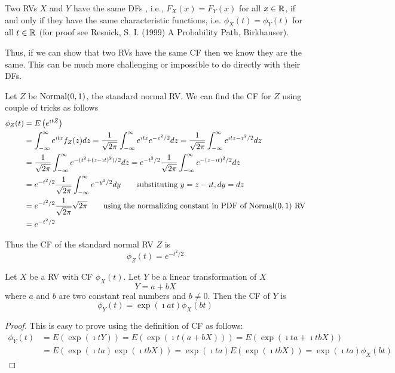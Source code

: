 Two RVs $X$ and $Y$ have the same DFs , i.e., $F_X(x) = F_Y(x)$ for all $x \in \mathbb{R}$, if and only if they have the same characteristic functions, i.e. $\phi_X(t) = \phi_Y(t)$ for all $t \in \mathbb{R}$ (for proof see Resnick, S. I. (1999) A Probability Path, Birkhauser). 

Thus, if we can show that two RVs have the same CF then we know they are the same.  This can be much more challenging or impossible to do directly with their DFs.

Let $Z$ be $\mbox{{\rm Normal}}(0,1)$, the standard normal RV.
We can find the CF for $Z$ using couple of tricks as follows
\begin{align*}
\phi_Z(t)
&= E\left(e^{\imath t Z} \right)\\
&= \int_{-\infty}^{\infty} e^{\imath t z} f_Z(z) dz = \frac{1}{\sqrt{2 \pi}} \int_{-\infty}^{\infty} e^{\imath t z} e^{-z^2/2} dz = \frac{1}{\sqrt{2 \pi}} \int_{-\infty}^{\infty} e^{\imath t z -z^2/2} dz \\
&= \frac{1}{\sqrt{2 \pi}} \int_{-\infty}^{\infty} e^{-(t^2 + (z - \imath t)^2)/2} dz = e^{-t^2/2} \frac{1}{\sqrt{2 \pi}} \int_{-\infty}^{\infty} e^{ -(z - \imath t)^2/2} dz \\
&= e^{-t^2/2} \frac{1}{\sqrt{2 \pi}} \int_{-\infty}^{\infty} e^{ -y^2/2} dy  \qquad \text{substituting $y=z-\imath t, dy=dz$}\\
&= e^{-t^2/2} \frac{1}{\sqrt{2 \pi}} \sqrt{2 \pi}  \qquad \text{using the normalizing constant in PDF of $\mbox{{\rm Normal}}(0,1)$ RV}\\
&= e^{-t^2/2}
\end{align*}

Thus the CF of the standard normal RV $Z$ is
\begin{equation}\label{E:cfStandardNormal}
\boxed{
\phi_Z(t) = e^{-t^2/2}
}
\end{equation}


Let $X$ be a RV with CF $\phi_X(t)$.  Let $Y$ be a linear transformation of $X$
\[
Y= a + bX
\]
where $a$ and $b$ are two constant real numbers and $b \neq 0$.  
Then the CF of $Y$ is
\begin{equation}\label{E:cfofLinearTransformation}
\boxed{
\phi_Y(t) = \exp(\imath a t) \phi_X(b t)
}
\end{equation}

\begin{proof}
This is easy to prove using the definition of CF as follows:
\begin{align*}
\phi_Y(t)
&= E\left(\exp(\imath t Y) \right)
= E\left(\exp(\imath t (a + bX) ) \right)
= E\left(\exp(\imath t a + \imath t b X) \right)\\
&= E\left(\exp(\imath t a) \exp(\imath t b X) \right)
= \exp(\imath t a) E\left( \exp(\imath t b X) \right)
= \exp(\imath t a) \phi_X(b t)
\end{align*}
\end{proof}

